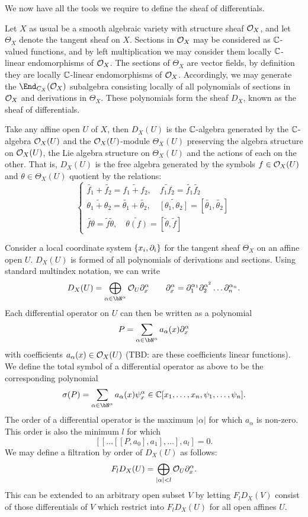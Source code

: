 \documentclass[a4paper]{article}
\begin{document}
We now have all the tools we require to define the sheaf of differentials.

Let $X$ as usual be a smooth algebraic variety with structure sheaf $\mathcal{O}_X$, and let $\Theta_X$ denote the tangent sheaf on $X$. Sections in $\mathcal{O}_X$ may be considered as $\mathbb{C}$-valued functions, and by left multiplication we may consider them locally $\mathbb{C}$-linear endomorphisms of $\mathcal{O}_X$. The sections of $\Theta_X$ are vector fields, by definition they are locally $\mathbb{C}$-linear endomorphisms of $\mathcal{O}_X$. Accordingly, we may generate the $\End_{C_X}(\cO_X)$ subalgebra consisting locally of all polynomials of sections in $\mathcal{O}_X$ and derivations in $\Theta_X$. These polynomials form the sheaf $D_X$, known as the sheaf of differentials.


Take any affine open $U$ of $X$, then $D_X(U)$ is the $\mathbb{C}$-algebra generated by the $\mathbb{C}$-algebra $\mathcal{O}_X(U)$ and the $\mathcal{O}_X(U)$-module $\Theta_X(U)$ preserving the algebra structure on $\mathcal{O}_X(U)$, the Lie algebra structure on $\Theta_X(U)$ and the actions of each on the other. That is, $D_X(U)$ is the free algebra generated by the symbols $f\in \mathcal{O}_X(U)$ and $\theta \in \Theta_X(U)$ quotient by the relations:
\[
    \begin{cases}
        \tilde{f_1} + \tilde{f_2} = \tilde{f_1 + f_2}, \quad \tilde{f_1f_2} = \tilde{f_1}\tilde{f_2}\\
        \tilde{\theta_1 + \theta_2} = \tilde{\theta_1} + \tilde{\theta_2}, \quad \widetilde{[\theta_1, \theta_2]} = [\tilde{\theta_1}, \tilde{\theta_2}] \\
        \widetilde{f\theta} = \tilde{f}\tilde{\theta}, \quad \widetilde{\theta(f)} = [\tilde{\theta}, \tilde{f}]
    \end{cases}
\]

Consider a local coordinate system $\{x_i, \partial_i\}$ for the tangent sheaf $\Theta_X$ on an affine open $U$. $D_X(U)$ is formed of all polynomials of derivations and sections. Using standard multindex notation, we can write
\[
    D_X(U) = \bigoplus_{\alpha \in \bN^\alpha} \cO_U \ptl^\alpha_x\qquad \ptl^\alpha_x = \ptl^{\alpha_1}_{1}\ptl^{\alpha^2}_{2}\dots\ptl^{\alpha_n}_{n}.
\]
Each differential operator on $U$ can then be written as a polynomial
\[
    P = \sum_{\alpha \in \bN^\alpha} a_\alpha(x) \ptl^\alpha_x
\]
with coefficients $a_\alpha(x) \in \mathcal{O}_X(U)$ (TBD: are these coefficients linear functions). We define the total symbol of a differential operator as above to be the corresponding polynomial
\[
    \sigma(P) = \sum_{\alpha \in \bN^\alpha} a_\alpha(x) \psi^\alpha_x \in \bC[x_1,\dots,x_n,\psi_1,\dots,\psi_n].
\]
The order of a differential operator is the maximum $|\alpha|$ for which $a_\alpha$ is non-zero. This order is also the minimum $l$ for which
\[
    [ [\dots [[ P, a_0], a_1], \dots], a_l ] = 0.
\]
We may define a filtration by order of $D_X(U)$ as follows:
\[
    F_l D_X(U) = \bigoplus_{|\alpha| < l} \mathcal{O}_U \partial^\alpha_x.
\]
This can be extended to an arbitrary open subset $V$ by letting $F_lD_X(V)$ consist of those differentials of $V$ which restrict into $F_lD_X(U)$ for all open affines $U$.
\end{document}
